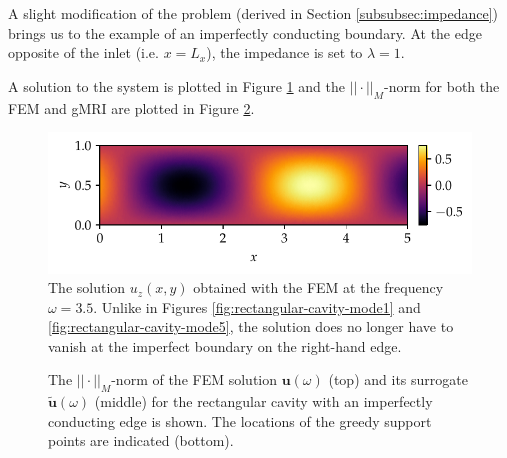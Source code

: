 \documentclass[11pt, a4paper]{article}
\begin{document}
A slight modification of the problem (derived in Section \ref{subsubsec:impedance})
brings us to the example of an imperfectly conducting boundary. At the edge 
opposite of the inlet (i.e. $x=L_x$), the impedance is set to $\lambda=1$.

A solution to the system is plotted in Figure \ref{fig:imperfect-conductor-solution}
and the $||\cdot||_M$-norm for both the \acrshort{FEM} and \acrshort{gMRI}
are plotted in Figure \ref{fig:imperfect-conductor-norms}.

\begin{figure}[ht]
    \centering
    \includegraphics{plots/imperfect_conductor_solution.pdf}
    \caption{The solution $u_z(x, y)$ obtained with the \acrshort{FEM} at the
    frequency $\omega = 3.5$. Unlike in Figures \ref{fig:rectangular-cavity-mode1}
    and \ref{fig:rectangular-cavity-mode5}, the solution does no longer have to
    vanish at the imperfect boundary on the right-hand edge.}
    \label{fig:imperfect-conductor-solution}
\end{figure}

\begin{figure}[ht]
    \centering
    
    \caption{The $||\cdot||_M$-norm of the \acrshort{FEM} solution $\mathbf{u}(\omega)$ (top) and
    its surrogate $\mathbf{\tilde{u}}(\omega)$ (middle) for the rectangular cavity with
    an imperfectly conducting edge is shown. The locations of the greedy support
    points are indicated (bottom).}
    \label{fig:imperfect-conductor-norms}
\end{figure}
\end{document}
